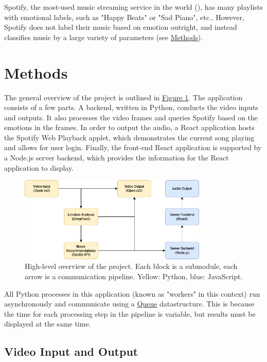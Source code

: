 \documentclass{article}
\renewcommand{\_}[1]{\underline{ #1 }}
\theoremstyle{definition}
\begin{document}
Spotify, the most-used music streaming service in the world (\cite{mulligan2022}), has many playlists with emotional labels, such as "Happy Beats" or "Sad Piano", etc.. However, Spotify does not label their music based on emotion outright, and instead classifies music by a large variety of parameters (see \hyperref[Methods]{Methods}). 



\section[Methods]{Methods}
\label{Methods}

The general overview of the project is outlined in \hyperref[fig1]{Figure 1}. The application consists of a few parts. A backend, written in Python, conducts the video inputs and outputs. It also processes the video frames and queries Spotify based on the emotions in the frames. In order to output the audio, a React application hosts the Spotify Web Playback applet, which demonstrates the current song playing and allows for user login. Finally, the front-end React application is supported by a Node.js server backend, which provides the information for the React application to display. 

\begin{figure}[h]
    \centering
    \includegraphics[width=0.8\textwidth]{FtM Project.drawio.png}
    \caption{High-level overview of the project. Each block is a submodule, each arrow is a communication pipeline. Yellow: Python, blue: JavaScript.}
    \label{fig1}
\end{figure}

All Python processes in this application (known as "workers" in this context) run asynchronously and communicate using a \href{https://docs.python.org/3/library/queue.html}{Queue} datastructure. This is because the time for each processing step in the pipeline is variable, but results must be displayed at the same time. 

\subsection[Video Input and Output]{Video Input and Output}
\end{document}
